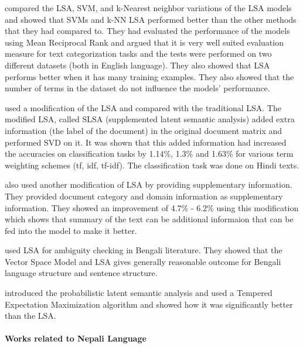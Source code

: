 \documentclass[12pt]{report}
\begin{document}
                            \cite{cardoso2003empirical} compared the LSA, SVM, and k-Nearest neighbor variations of the LSA models and showed that SVMs and k-NN LSA performed better 
                            than the other methods that they had compared to. They had evaluated the performance of the models using Mean Reciprocal Rank and argued that it is very well
                            suited evaluation measure for text categorization tasks and the tests were performed on two different datasets (both in English language). They also showed that LSA performs better 
                            when it has many training examples. They also showed that the number of terms in the dataset do not influence the models' performance. 

                            \cite{krishnamurthi2017including} used a modification of the LSA and compared with the traditional LSA. The modified LSA, called
                            SLSA (supplemented latent semantic analysis) added extra information (the label of the document) in the original document matrix 
                            and performed SVD on it. It was shown that this added information had increased the accuracies on classification tasks by 1.14\%, 1.3\% 
                            and 1.63\% for various term weighting schemes (tf, idf, tf-idf). The classification task was done on Hindi texts. 

                            \cite{krishnamurthi2016understanding} also used another modification of LSA by providing supplementary information. They provided 
                            document category and domain information as supplementary information. They showed an improvement of 4.7\% - 6.2\% using this modification which shows that 
                            summary of the text can be additional informaion that can be fed into the model to make it better.

                            \cite{nipu2017machine} used LSA for ambiguity checking in Bengali literature. They showed that the Vector Space Model and LSA gives generally reasonable
                            outcome for Bengali language structure and sentence structure. 

                            \cite{hofmann2013probabilistic} introduced the probabilistic latent semantic analysis and used a Tempered Expectation Maximization algorithm and showed how it was
                            significantly better than the LSA.         
                    \paragraph{Works related to Nepali Language}
\end{document}
